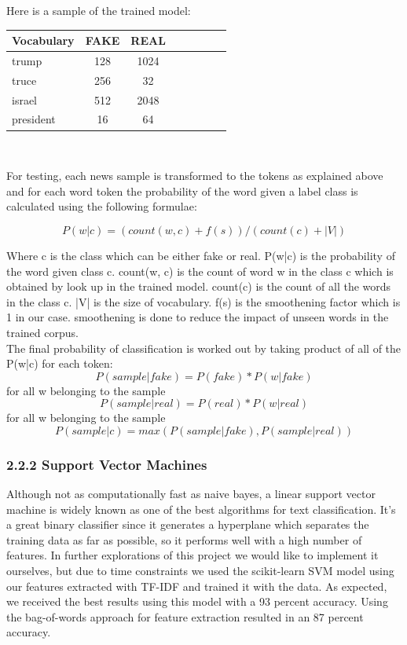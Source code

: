 \documentclass{neu_handout}
\begin{document}
Here is a sample of the trained model:

\begin{table}[h]
\centering
\begin{tabular}{l*{6}{c}r}
Vocabulary     & FAKE & REAL \\
\hline
trump 			& 128 & 1024   \\
truce            & 256 & 32  \\
israel           & 512 & 2048  \\
president     & 16 & 64  \\
\end{tabular}\\
\end{table}

For testing, each news sample is transformed to the tokens as explained above and for each word token the probability of the word given a label class is calculated using the following formulae:

$$P(w|c) = (count(w, c) + f(s))/(count(c) + |V|)$$

Where c is the class which can be either fake or real. P(w|c) is the probability of the word given class c. count(w, c) is the count of word w in the class c which is obtained by look up in the trained model. count(c) is the count of all the words in the class c. |V| is the size of vocabulary. f(s) is the smoothening factor  which is 1 in our case. smoothening is done to reduce the impact of unseen words in the trained corpus.\\

The final probability of classification is worked out by taking product of all of the P(w|c) for each token:\\
$$P(sample|fake) = P(fake) * P(w|fake)$$ for all w belonging to the sample
$$P(sample|real) = P(real) * P(w|real)$$ for all w belonging to the sample
$$P(sample|c) = max(P(sample|fake), P(sample|real))$$


\subsubsection*{2.2.2 Support Vector Machines}

Although not as computationally fast as naive bayes, a linear support vector machine is widely known as one of the best  algorithms for text classification. It's a great binary classifier since it generates a hyperplane which separates the training data as far as possible, so it performs well with a high number of features. In further explorations of this project we would like to implement it ourselves, but due to time constraints we used the scikit-learn SVM model using our features extracted with TF-IDF and trained it with the data. As expected, we received the best results using this model with a 93 percent accuracy. Using the bag-of-words approach for feature extraction resulted in an 87 percent accuracy.
\end{document}
